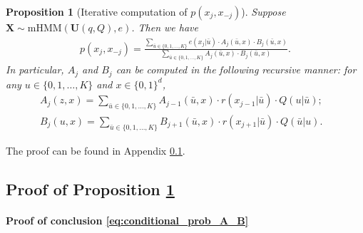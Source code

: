 \documentclass[12pt]{article}
\newtheorem{proposition}{Proposition}
\theoremstyle{definition}
\newcommand{\prx}{\bm X}								%
\newcommand{\pru}{{\bm U}}								%
\begin{document}
\begin{proposition}[Iterative computation of $p(x_j,x_{-j})$]\label{prop:conditional_prob}
	Suppose $\prx\sim \text{mHMM}(\pru(q,Q),e)$. Then we have
	\begin{align}\label{eq:conditional_prob_A_B}
		p(x_j,x_{-j})=\frac{\sum_{\bar u\in\{0,1,\ldots,K\}}e(x_j|\bar u)\cdot A_j(\bar u,x)\cdot B_j(\bar u,x)}{\sum_{\bar u\in \{0,1,\ldots,K\}}A_j(\bar u,x)\cdot B_j(\bar u,x)}.
	\end{align}
	In particular, $A_j$ and $B_j$ can be computed in the following recursive manner: for any $u\in\{0,1,\ldots,K\}$ and $x\in\{0,1\}^{d}$, 
	\begin{align*}
		A_j(z,x)=\sum_{\bar u\in\{0,1,\ldots,K\}}A_{j-1}(\bar u,x)\cdot r(x_{j-1}|\bar u)\cdot Q(u|\bar u);&\\
		B_j(u,x)=\sum_{\bar u\in\{0,1,\ldots,K\}}B_{j+1}(\bar u,x)\cdot r(x_{j+1}|\bar u)\cdot Q(\bar u|u).&
	\end{align*}
\end{proposition}
The proof can be found in Appendix \ref{sec:conditional_prob}.


\subsection{Proof of Proposition \ref{prop:conditional_prob}}\label{sec:conditional_prob}

\paragraph{Proof of conclusion \eqref{eq:conditional_prob_A_B}}
\end{document}
